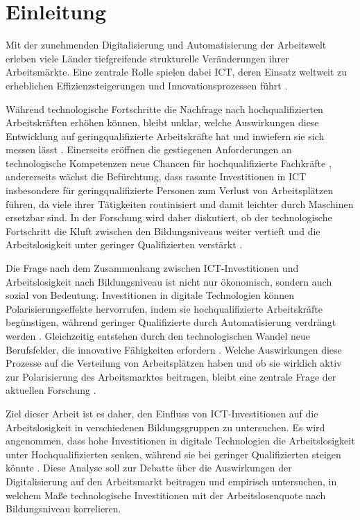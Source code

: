 \section{Einleitung}

Mit der zunehmenden Digitalisierung und Automatisierung der Arbeitswelt erleben viele 
Länder tiefgreifende strukturelle Veränderungen ihrer Arbeitsmärkte. Eine zentrale Rolle 
spielen dabei \ac{ICT}, deren Einsatz weltweit zu erheblichen Effizienzsteigerungen und 
Innovationsprozessen führt \parencite[vgl.][Kap. 6]{brynjolfsson2014thesecond}.

Während technologische Fortschritte die Nachfrage nach hochqualifizierten Arbeitskräften 
erhöhen können, bleibt unklar, welche Auswirkungen diese Entwicklung auf 
geringqualifizierte Arbeitskräfte hat und inwiefern sie sich messen lässt 
\parencite[vgl.][S. 1045]{acemoglu2011skills}. Einerseits eröffnen die gestiegenen 
Anforderungen an technologische Kompetenzen neue Chancen für hochqualifizierte 
Fachkräfte \parencite[vgl.][S. 1070]{acemoglu2011skills}, andererseits wächst die 
Befürchtung, dass rasante Investitionen in \ac{ICT} insbesondere für geringqualifizierte 
Personen zum Verlust von Arbeitsplätzen führen, da viele ihrer Tätigkeiten routinisiert 
und damit leichter durch Maschinen ersetzbar sind. In der Forschung wird daher diskutiert, 
ob der technologische Fortschritt die Kluft zwischen den Bildungsniveaus weiter vertieft 
und die Arbeitslosigkeit unter geringer Qualifizierten verstärkt 
\parencite[vgl.][S. 2–4]{balsmeier2019isthis}.

Die Frage nach dem Zusammenhang zwischen \ac{ICT}-Investitionen und Arbeitslosigkeit 
nach Bildungsniveau ist nicht nur ökonomisch, sondern auch sozial von Bedeutung. 
Investitionen in digitale Technologien können Polarisierungseffekte hervorrufen, 
indem sie hochqualifizierte Arbeitskräfte begünstigen, während geringer Qualifizierte 
durch Automatisierung verdrängt werden \parencite[vgl.][S. 14–15]{frey2013thefuture}. 
Gleichzeitig entstehen durch den technologischen Wandel neue Berufsfelder, die 
innovative Fähigkeiten erfordern \parencite[vgl.][Kap. 12]{brynjolfsson2014thesecond}. 
Welche Auswirkungen diese Prozesse auf die Verteilung von Arbeitsplätzen haben und 
ob sie wirklich aktiv zur Polarisierung des Arbeitsmarktes beitragen, bleibt eine 
zentrale Frage der aktuellen Forschung \parencite[vgl.][S. 2–4]{balsmeier2019isthis}.

Ziel dieser Arbeit ist es daher, den Einfluss von \ac{ICT}-Investitionen auf die 
Arbeitslosigkeit in verschiedenen Bildungsgruppen zu untersuchen. Es wird angenommen, 
dass hohe Investitionen in digitale Technologien die Arbeitslosigkeit unter 
Hochqualifizierten senken, während sie bei geringer Qualifizierten steigen könnte 
\parencite[vgl.][S. 1045]{acemoglu2011skills}. Diese Analyse soll zur Debatte über die 
Auswirkungen der Digitalisierung auf den Arbeitsmarkt beitragen und empirisch untersuchen, 
in welchem Maße technologische Investitionen mit der Arbeitslosenquote nach 
Bildungsniveau korrelieren.

